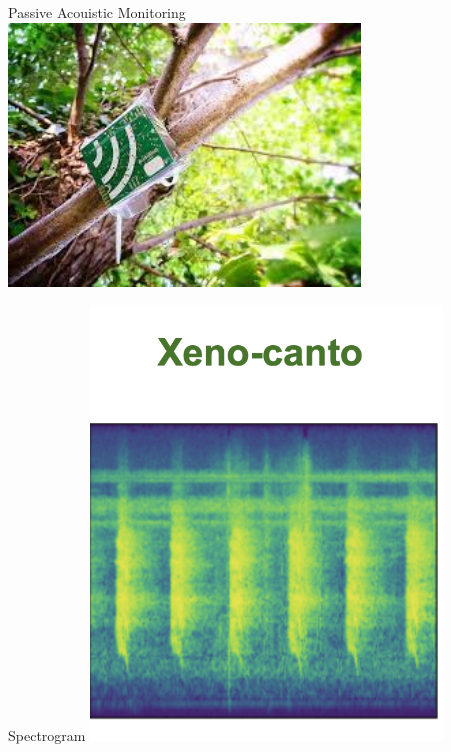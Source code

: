 \begin{frame}{Passive Acouistic Monitoring}
    \centering
    \includegraphics[height=0.7\textheight,width=0.7\textwidth,keepaspectratio]{images/pam.jpeg}
\end{frame}


\begin{frame}{Spectrogram}
    \centering
    \includegraphics[height=0.7\textheight,width=0.7\textwidth,keepaspectratio]{images/xeno.png}
\end{frame}


